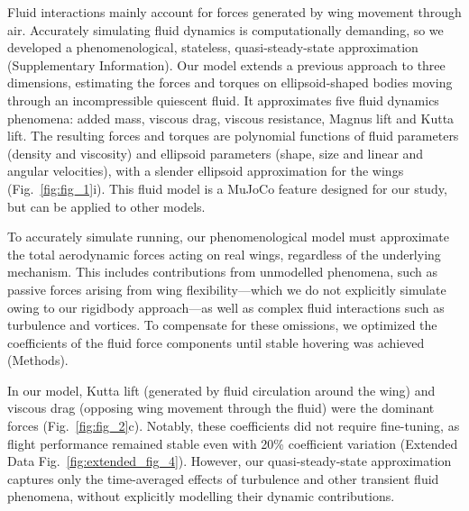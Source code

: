 \documentclass[sn-mathphys-num]{sn-jnl}%
\theoremstyle{thmstyleone}%
\theoremstyle{thmstyletwo}%
\theoremstyle{thmstylethree}%
\begin{document}
Fluid interactions mainly account for forces generated by wing movement through air. 
Accurately simulating fluid dynamics is computationally demanding, so we developed a phenomenological, stateless, quasi-steady-state approximation (Supplementary Information). 
Our model extends a previous approach\cite{andersen2005analysis} to three dimensions, estimating the forces and torques on ellipsoid-shaped bodies moving through an incompressible quiescent fluid. 
It approximates five fluid dynamics phenomena: added mass\cite{lamb1993hydrodynamics,tuckerman1925inertia}, viscous drag\cite{duan2015sphere}, viscous resistance\cite{stokes1851effect}, Magnus lift\cite{seifert2012review} and Kutta lift\cite{kutta1902lift}. 
The resulting forces and torques are polynomial functions of fluid parameters (density and viscosity) and ellipsoid parameters (shape, size and linear and angular velocities), with a slender ellipsoid approximation for the wings (Fig.~\ref{fig:fig_1}i). 
This fluid model is a MuJoCo feature designed for our study, but can be applied to other models.


To accurately simulate running, our phenomenological model must approximate the total aerodynamic forces acting on real wings, regardless of the underlying mechanism. 
This includes contributions from unmodelled phenomena, such as passive forces arising from wing flexibility\cite{sane2003aerodynamics}—which we do not explicitly simulate owing to our rigidbody approach—as well as complex fluid interactions such as turbulence and vortices. 
To compensate for these omissions, we optimized the coefficients of the fluid force components until stable hovering was achieved (Methods).



In our model, Kutta lift (generated by fluid circulation around the wing) and viscous drag (opposing wing movement through the fluid) were the dominant forces (Fig.~\ref{fig:fig_2}c). 
Notably, these coefficients did not require fine-tuning, as flight performance remained stable even with 20\% coefficient variation (Extended Data Fig.~\ref{fig:extended_fig_4}). 
However, our quasi-steady-state approximation captures only the time-averaged effects of turbulence and other transient fluid phenomena, without explicitly modelling their dynamic contributions.
\end{document}
